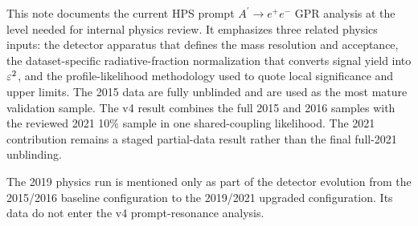 This note documents the current HPS prompt $A^\prime \rightarrow e^+e^-$ GPR analysis
at the level needed for internal physics review. It emphasizes three related physics
inputs: the detector apparatus that defines the mass resolution and acceptance, the
dataset-specific radiative-fraction normalization that converts signal yield into
$\varepsilon^2$, and the profile-likelihood methodology used to quote local significance and
upper limits. The 2015 data are fully unblinded and are used as the most mature
validation sample. The v4 result combines the full 2015 and 2016 samples with the
reviewed 2021 10\% sample in one shared-coupling likelihood. The 2021 contribution
remains a staged partial-data result rather than the final full-2021 unblinding.

The 2019 physics run is mentioned only as part of the detector evolution from the
2015/2016 baseline configuration to the 2019/2021 upgraded configuration. Its data do
not enter the v4 prompt-resonance analysis.

